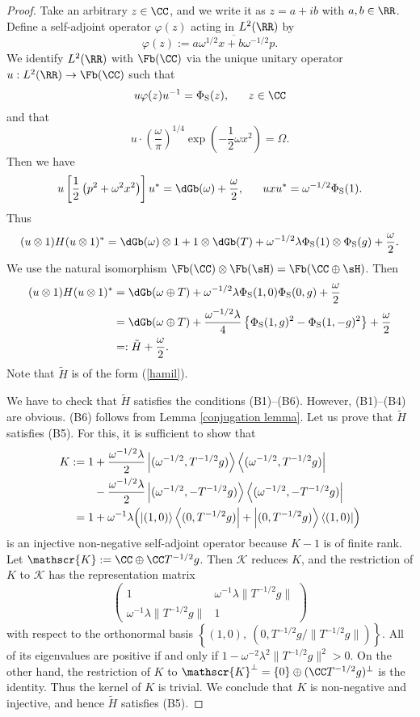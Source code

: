 \documentclass[12pt,draft]{article}
\theoremstyle{plain}
\numberwithin{equation}{section}
\theoremstyle{remark}
\begin{document}
\begin{proof}
Take an arbitrary $z\in\CC$, and we write it as $z=a+ib$ with $a,b\in\RR$. 
Define a self-adjoint operator $\varphi(z)$ acting in $L^2(\RR)$ by
\[
\varphi(z):=\overline{a\omega^{1/2}x
+b\omega^{-1/2}p}.
\]
We identify $L^2(\RR)$ with $\Fb(\CC)$ via the 
unique unitary operator $u:L^2(\RR)\to\Fb(\CC)$ 
such that
\[
u\varphi(z)u^{-1}=\Phi_{\rm S}(z), \ \ \ \ \ z\in\CC
\]
and that 
\[
u\cdot\left(\frac{\omega}{\pi}\right)^{1/4}
\exp{\left(-\frac{1}{2}\omega x^2\right)}=\Omega.
\]
Then we have
\[
u\left[\frac{1}{2}\left(p^2  +\omega^2x^2\right)\right]u^*  
= \dGb(\omega)+\frac{\omega}{2},
\ \ \ \ \ uxu^*=\omega^{-1/2}\Phi_{\rm S}(1).
\]
Thus
\[
(u\otimes1)H(u\otimes1)^*=\dGb(\omega)\otimes1+1\otimes\dGb(T)
+\omega^{-1/2}\lambda\Phi_{\rm S}(1)
\otimes\Phi_{\rm S}(g)+\frac{\omega}{2}.
\]
We use the natural isomorphism
$\Fb(\CC)\otimes\Fb(\sH)=\Fb(\CC\oplus\sH)$.
Then
\begin{align*}
(u\otimes1)H(u\otimes1)^*&=\dGb(\omega\oplus T) +\omega^{-1/2}\lambda\Phi_{\rm S}(1,0)\Phi_{\rm S}(0,g)+\frac{\omega}{2}\\
&=\dGb(\omega\oplus T) +\frac{\omega^{-1/2}\lambda}{4}\left\{\Phi_{\rm S}(1,g)^2-\Phi_{\rm S}(1,-g)^2\right\}+\frac{\omega}{2}\\
&=:\tilde{H}+\frac{\omega}{2}.
\end{align*}
Note that $\tilde{H}$ is of the form (\ref{hamil}).

We have to check that $\tilde{H}$ satisfies the conditions (B1)--(B6).
However, (B1)--(B4) are obvious.
(B6) follows from Lemma \ref{conjugation lemma}.
Let us prove that $\tilde{H}$ satisfies (B5).
For this, it is sufficient to show that
\begin{align*}
K:=1&+\frac{\omega^{-1/2}\lambda}{2} 
\left|(\omega^{-1/2},T^{-1/2}g)\right\rangle\left\langle (\omega^{-1/2},T^{-1/2}g)\right|\\
&- \frac{\omega^{-1/2}\lambda}{2} \left|(\omega^{-1/2},-T^{-1/2}g)\right\rangle\left\langle (\omega^{-1/2},-T^{-1/2}g)\right|\\
=1&+\omega^{-1}\lambda
\Bigl(\left|(1,0)\right\rangle\left\langle (0,T^{-1/2}g)\right|
+\left|(0,T^{-1/2}g)\right\rangle\left\langle (1,0)\right|\Bigr)
\end{align*}
is an injective non-negative self-adjoint operator because $K-1$ is of finite rank.
Let $\mathscr{K}:=\CC\oplus\CC T^{-1/2}g$.
Then $\mathscr{K}$ reduces $K$, and the restriction of $K$ to $\mathscr{K}$ has the representation matrix
\[
\begin{pmatrix}
1 & \omega^{-1}\lambda\|T^{-1/2}g\| \\
\omega^{-1}\lambda\|T^{-1/2}g\| & 1
\end{pmatrix}
\]
with respect to the orthonormal basis $\left\{(1,0),\ (0,T^{-1/2}g/\|T^{-1/2}g\|)\right\}$.
All of its eigenvalues are positive if and only if $1-\omega^{-2}\lambda^2\|T^{-1/2}g\|^2>0$.
On the other hand, the restriction of $K$ to $\mathscr{K}^{\perp}=\{0\}\oplus(\CC T^{-1/2}g)^{\perp}$ is the identity.
Thus the kernel of $K$ is trivial.
We conclude that $K$ is non-negative and injective, and hence $\tilde{H}$ satisfies (B5).


\end{proof}
\end{document}
